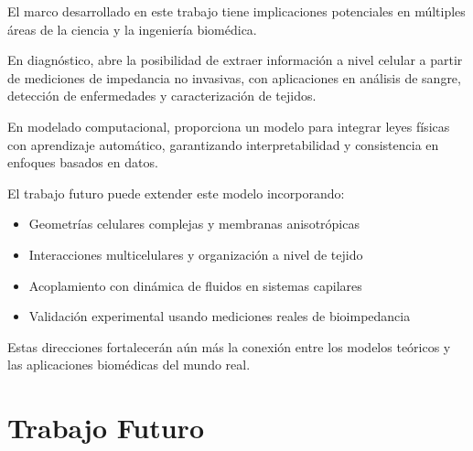 \documentclass[12pt]{article}
\begin{document}
\label{sec:impact}


El marco desarrollado en este trabajo tiene implicaciones potenciales en m\'ultiples \'areas
de la ciencia y la ingenier\'ia biom\'edica.

En diagn\'ostico, abre la posibilidad de extraer informaci\'on a nivel celular a partir de
mediciones de impedancia no invasivas, con aplicaciones en an\'alisis de sangre, detecci\'on
de enfermedades y caracterizaci\'on de tejidos.

En modelado computacional, proporciona un modelo para integrar leyes f\'isicas con
aprendizaje autom\'atico, garantizando interpretabilidad y consistencia en enfoques
basados en datos.

El trabajo futuro puede extender este modelo incorporando:
\begin{itemize}
\item Geometr\'ias celulares complejas y membranas anisotr\'opicas
\item Interacciones multicelulares y organizaci\'on a nivel de tejido
\item Acoplamiento con din\'amica de fluidos en sistemas capilares
\item Validaci\'on experimental usando mediciones reales de bioimpedancia
\end{itemize}

Estas direcciones fortalecer\'an a\'un m\'as la conexi\'on entre los modelos te\'oricos y las
aplicaciones biom\'edicas del mundo real.


\section{Trabajo Futuro}

\label{sec:futuro}

\end{document}
